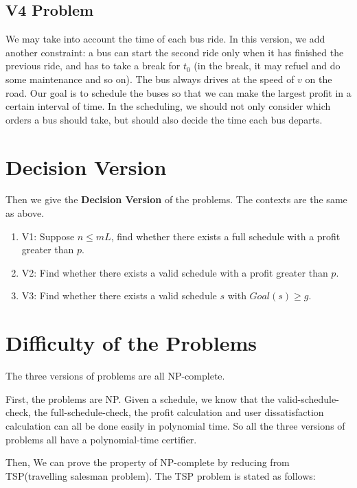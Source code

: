 \documentclass{llncs}
\begin{document}
\subsection{V4 Problem}
We may take into account the time of each bus ride. In this version, we add another constraint: a bus can start the second ride only when it has finished the previous ride, and has to take a break for $t_0$ (in the break, it may refuel and do some maintenance and so on). The bus always drives at the speed of $v$ on the road. Our goal is to schedule the buses so that we can make the largest profit in a certain interval of time. In the scheduling, we should not only consider which orders a bus should take, but should also decide the time each bus departs.


\section{Decision Version}
Then we give the \textbf{Decision Version} of the problems. The contexts are the same as above.
\begin{enumerate}
\item V1: Suppose $n \leq mL$, find whether there exists a full schedule with a profit greater than $p$.
\item V2: Find whether there exists a valid schedule with a profit greater than $p$.
\item V3: Find whether there exists a valid schedule $s$ with $Goal(s) \geq g$.
\end{enumerate}

\section{Difficulty of the Problems}
The three versions of problems are all NP-complete. 

First, the problems are NP. Given a schedule, we know that the valid-schedule-check, the full-schedule-check, the profit calculation and user dissatisfaction calculation can all be done easily in polynomial time. So all the three versions of problems all have a polynomial-time certifier.

Then, We can prove the property of NP-complete by reducing from TSP(travelling salesman problem).
The TSP problem is stated as follows:
\end{document}

